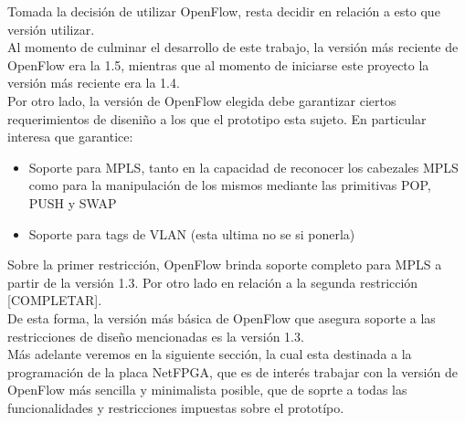 




Tomada la decisi\'on de utilizar OpenFlow, resta decidir en relaci\'on a esto que versi\'on utilizar.\\
Al momento de culminar el desarrollo de este trabajo, la versi\'on m\'as reciente de OpenFlow era la 1.5, mientras que al momento de iniciarse este proyecto la versi\'on m\'as reciente era la 1.4.\\

Por otro lado, la versi\'on de OpenFlow elegida debe garantizar ciertos requerimientos de diseni\~no a los que el prototipo esta sujeto. En particular interesa que garantice:

\begin{itemize}
\item Soporte para MPLS, tanto en la capacidad de reconocer los cabezales MPLS como para la manipulaci\'on de los mismos mediante las primitivas POP, PUSH y SWAP
\item Soporte para tags de VLAN (esta ultima no se si ponerla)
\end{itemize}

Sobre la primer restricci\'on, OpenFlow brinda soporte completo para MPLS a partir de la versi\'on 1.3. Por otro lado en relaci\'on a la segunda restricci\'on [COMPLETAR].\\

De esta forma, la versi\'on m\'as b\'asica de OpenFlow que asegura soporte a las restricciones de dise\~no mencionadas es la versi\'on 1.3.\\

M\'as adelante veremos en la siguiente secci\'on, la cual  esta destinada a la programaci\'on de la placa NetFPGA, que es de inter\'es trabajar con la versi\'on de OpenFlow m\'as sencilla y minimalista posible, que de soprte a todas las funcionalidades y restricciones impuestas sobre el protot\'ipo.\\ 

